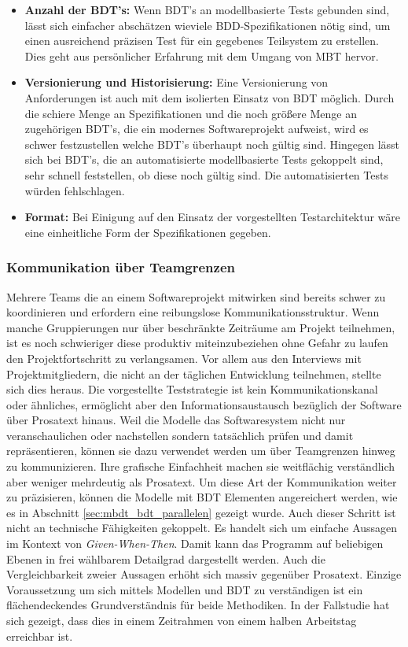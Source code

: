 \begin{itemize}
\item \textbf{Anzahl der \Gls{BDT}'s:} Wenn \Gls{BDT}'s  an modellbasierte Tests gebunden sind, lässt sich einfacher abschätzen wieviele \Gls{BDD}-Spezifikationen nötig sind, um einen ausreichend präzisen Test für ein gegebenes Teilsystem zu erstellen. Dies geht aus persönlicher Erfahrung mit dem Umgang von \Gls{MBT} hervor.
\item \textbf{Versionierung und Historisierung:} Eine Versionierung von Anforderungen ist auch mit dem isolierten Einsatz von \Gls{BDT} möglich. Durch die schiere Menge an Spezifikationen und die noch größere Menge an zugehörigen \Gls{BDT}'s, die ein modernes Softwareprojekt aufweist, wird es schwer festzustellen welche \Gls{BDT}'s überhaupt noch gültig sind. Hingegen lässt sich bei \Gls{BDT}'s, die an automatisierte modellbasierte Tests gekoppelt sind, sehr schnell feststellen, ob diese noch gültig sind. Die automatisierten Tests würden fehlschlagen.
\item \textbf{Format:} Bei Einigung auf den Einsatz der vorgestellten Testarchitektur wäre eine einheitliche Form der Spezifikationen gegeben.
\end{itemize}

\subsubsection{Kommunikation über Teamgrenzen}
Mehrere Teams die an einem Softwareprojekt mitwirken sind bereits schwer zu koordinieren und erfordern eine reibungslose Kommunikationsstruktur. Wenn manche Gruppierungen nur über beschränkte Zeiträume am Projekt teilnehmen, ist es noch schwieriger diese produktiv miteinzubeziehen ohne Gefahr zu laufen den Projektfortschritt zu verlangsamen. Vor allem aus den Interviews mit Projektmitgliedern, die nicht an der täglichen Entwicklung teilnehmen, stellte sich dies heraus. Die vorgestellte Teststrategie ist kein Kommunikationskanal oder ähnliches, ermöglicht aber den Informationsaustausch bezüglich der Software über Prosatext hinaus. Weil die Modelle das Softwaresystem nicht nur veranschaulichen oder nachstellen sondern tatsächlich prüfen und damit repräsentieren, können sie dazu verwendet werden um über Teamgrenzen hinweg zu kommunizieren. Ihre grafische Einfachheit machen sie weitflächig verständlich aber weniger mehrdeutig als Prosatext. Um diese Art der Kommunikation weiter zu präzisieren, können die Modelle mit \Gls{BDT} Elementen angereichert werden, wie es in Abschnitt \ref{sec:mbdt_bdt_parallelen} gezeigt wurde. Auch dieser Schritt ist nicht an technische Fähigkeiten gekoppelt. Es handelt sich um einfache Aussagen im Kontext von \textit{Given-When-Then}. Damit kann das Programm auf beliebigen Ebenen in frei wählbarem Detailgrad dargestellt werden. Auch die Vergleichbarkeit zweier Aussagen erhöht sich massiv gegenüber Prosatext. Einzige Voraussetzung um sich mittels Modellen und BDT zu verständigen ist ein flächendeckendes Grundverständnis für beide Methodiken. In der Fallstudie hat sich gezeigt, dass dies in einem Zeitrahmen von einem halben Arbeitstag erreichbar ist.

